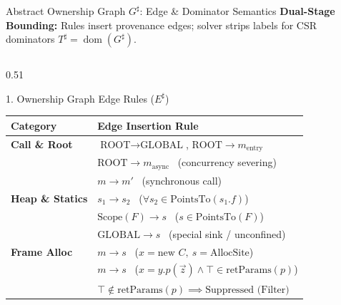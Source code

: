 \documentclass[11pt]{beamer}
\providecommand{\retParams}{\text{retParams}}
\providecommand{\ROOT}{\text{ROOT}}
\providecommand{\GLOBAL}{\text{GLOBAL}}
\providecommand{\dom}{\mathrel{\text{dom}}}
\begin{document}
\begingroup
{}
\begin{frame}{Abstract Ownership Graph $G^\sharp$: Edge \& Dominator Semantics}
  \vspace{-0.6em}
  {\scriptsize\textbf{Dual-Stage Bounding:} Rules insert provenance edges; solver strips labels for CSR dominators $T^\sharp = \dom(G^\sharp)$.}\par\vspace{1pt}

  \begin{columns}[T,onlytextwidth]
    \begin{column}{0.51\textwidth}
      \begin{block}{1. Ownership Graph Edge Rules ($E^\sharp$)}
        \fontsize{5.7pt}{6.8pt}\selectfont
        \setlength{\tabcolsep}{2.5pt}
        \begin{tabular}{@{}ll@{}}
          \toprule
          \textbf{Category} & \textbf{Edge Insertion Rule} \\
          \midrule
          \textbf{Call \& Root}    & $\ROOT \to \GLOBAL$, \quad $\ROOT \to m_{\text{entry}}$ \\
                                   & $\ROOT \to m_{\text{async}}$ \ (concurrency severing) \\
                                   & $m \to m'$ \ (synchronous call) \\
          \midrule
          \textbf{Heap \& Statics} & $s_1 \to s_2$ \ ($\forall s_2 \in \text{PointsTo}(s_1.f)$) \\
                                   & $\text{Scope}(F) \to s$ \ ($s \in \text{PointsTo}(F)$) \\
                                   & $\GLOBAL \to s$ \ (special sink / unconfined) \\
          \midrule
          \textbf{Frame Alloc}     & $m \to s$ \ ($x = \text{new } C, \ s = \text{AllocSite}$) \\
                                   & $m \to s$ \ ($x = y.p(\vec{z}) \land \top \in \retParams(p)$) \\
                                   & $\top \notin \retParams(p) \implies \text{Suppressed (Filter)}$ \\
          \bottomrule
        \end{tabular}
      \end{block}
    \end{column}


\end{columns}
\end{frame}
\end{document}
